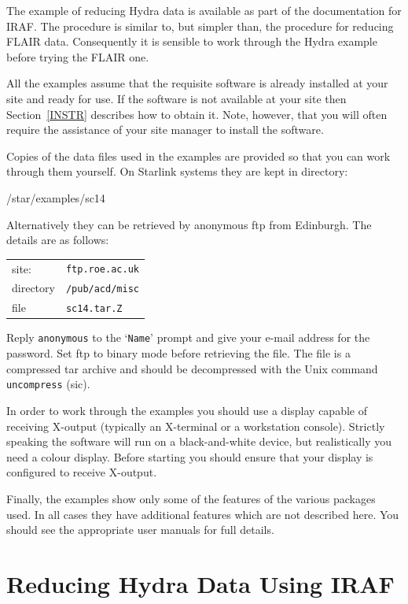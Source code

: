 \documentclass[chapters,twoside,11pt]{starlink}
\begin{document}
The example of reducing Hydra data is available as part of the
documentation for IRAF.  The procedure is similar to, but simpler
than, the procedure for reducing FLAIR data.  Consequently it is
sensible to work through the Hydra example before trying the FLAIR
one.

All the examples assume that the requisite software is already installed
at your site and ready for use.  If the software is not available at
your site then Section~\ref{INSTR} describes how to obtain it.  Note,
however, that you will often require the assistance of your site manager
to install the software.

Copies of the data files used in the examples are provided so that you can
work through them yourself.  On Starlink systems they are kept in directory:

\begin{terminalv}
/star/examples/sc14
\end{terminalv}

Alternatively they can be retrieved by anonymous ftp from Edinburgh.
The details are as follows:

\begin{tabular}{ll}
site:     & \texttt{ftp.roe.ac.uk} \\
directory & \texttt{/pub/acd/misc} \\
file      & \texttt{sc14.tar.Z}    \\
\end{tabular}

Reply \texttt{anonymous} to the `\texttt{Name}' prompt and give your e-mail
address for the password.  Set ftp to binary mode before retrieving the
file.  The file is a compressed tar archive and should be decompressed
with the Unix command \texttt{uncompress} (sic).

In order to work through the examples you should use a display capable
of receiving X-output (typically an X-terminal or a workstation console).
Strictly speaking the software will run on a black-and-white device, but
realistically you need a colour display.  Before starting you should
ensure that your display is configured to receive X-output.

Finally, the examples show only some of the features of the various
packages used.  In all cases they have additional features which are not
described here.  You should see the appropriate user manuals for full
details.


\newpage
\section{\label{HYDRA}Reducing Hydra Data Using IRAF}
\end{document}
